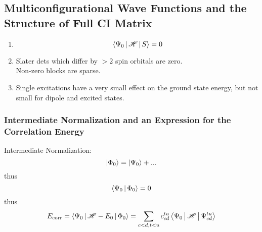 \documentclass[a4paper]{article}
\DeclareMathOperator{\corr}{\mathrm{corr}}
\numberwithin{equation}{section}
\begin{document}
\subsection{Multiconfigurational Wave Functions and the Structure of Full CI Matrix}
\begin{enumerate}
	\item 
	\begin{equation}\label{key}
	\Braket{\Psi_0 | \mathscr{H} | S} = 0
	\end{equation}
	\item 
	Slater dets which differ by $ >2 $ spin orbitals are zero.\\
	Non-zero blocks are sparse.
	\item 
	Single excitations have a very small effect on the ground state energy, but not small for dipole and excited states.
\end{enumerate}

\subsubsection{Intermediate Normalization and an Expression for the Correlation Energy}
Intermediate Normalization:
\begin{equation}\label{key}
\ket{\Phi_0} = \ket{\Psi_0} + ...
\end{equation}
thus
\begin{equation}\label{key}
\Braket{\Psi_0|\Phi_0} = 0
\end{equation}
thus
\begin{equation}\label{key}
E_{\corr} = \Braket{\Psi_0 | \mathscr{H} - E_0 | \Phi_0} = \sum_{c<d,t<u} c_{cd}^{tu} \Braket{\Psi_0 | \mathscr{H} | \Psi_{cd}^{tu}}
\end{equation}
\end{document}
